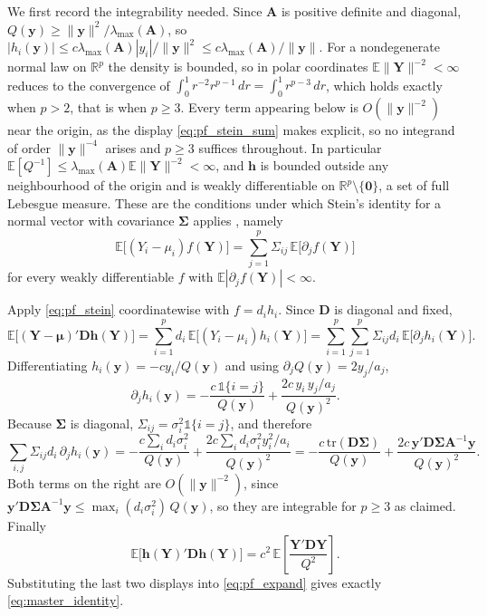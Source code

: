 \documentclass[pdflatex,sn-mathphys-num]{sn-jnl}%
\theoremstyle{thmstyleone}%
\theoremstyle{thmstyletwo}%
\theoremstyle{thmstylethree}%
\newcommand{\tr}{\mathrm{tr}}
\newcommand{\E}{\mathbb{E}}
\newcommand{\Real}{\mathbb{R}}
\begin{document}
\begin{appendices}
We first record the integrability needed. Since $\bm A$ is positive definite and diagonal, $Q(\bm y)\ge\|\bm y\|^2/\lambda_{\max}(\bm A)$, so $|h_i(\bm y)|\le c\lambda_{\max}(\bm A)|y_i|/\|\bm y\|^2\le c\lambda_{\max}(\bm A)/\|\bm y\|$. For a nondegenerate normal law on $\Real^p$ the density is bounded, so in polar coordinates $\E\|\bm Y\|^{-2}<\infty$ reduces to the convergence of $\int_0^{1}r^{-2}r^{p-1}\,dr=\int_0^{1}r^{p-3}\,dr$, which holds exactly when $p>2$, that is when $p\ge3$. Every term appearing below is $O(\|\bm y\|^{-2})$ near the origin, as the display \eqref{eq:pf_stein_sum} makes explicit, so no integrand of order $\|\bm y\|^{-4}$ arises and $p\ge3$ suffices throughout. In particular $\E[Q^{-1}]\le\lambda_{\max}(\bm A)\E\|\bm Y\|^{-2}<\infty$, and $\bm h$ is bounded outside any neighbourhood of the origin and is weakly differentiable on $\Real^p\setminus\{\bm 0\}$, a set of full Lebesgue measure. These are the conditions under which Stein's identity for a normal vector with covariance $\bm\Sigma$ applies \cite{stein1981, fourdrinier2018}, namely
\begin{equation}
\label{eq:pf_stein}
\E\bigl[(Y_i-\mu_i)f(\bm Y)\bigr]
=
\sum_{j=1}^{p}\Sigma_{ij}\,\E\bigl[\partial_jf(\bm Y)\bigr]
\end{equation}
for every weakly differentiable $f$ with $\E|\partial_jf(\bm Y)|<\infty$.

Apply \eqref{eq:pf_stein} coordinatewise with $f=d_ih_i$. Since $\bm D$ is diagonal and fixed,
\begin{equation}
\E\bigl[(\bm Y-\bm\mu)'\bm D\bm h(\bm Y)\bigr]
=
\sum_{i=1}^{p}d_i\,\E\bigl[(Y_i-\mu_i)h_i(\bm Y)\bigr]
=
\sum_{i=1}^{p}\sum_{j=1}^{p}\Sigma_{ij}d_i\,\E\bigl[\partial_jh_i(\bm Y)\bigr].
\end{equation}
Differentiating $h_i(\bm y)=-cy_i/Q(\bm y)$ and using $\partial_jQ(\bm y)=2y_j/a_j$,
\begin{equation}
\partial_jh_i(\bm y)
=
-\frac{c\,\mathbb 1\{i=j\}}{Q(\bm y)}
+\frac{2c\,y_i\,y_j/a_j}{Q(\bm y)^{2}} .
\end{equation}
Because $\bm\Sigma$ is diagonal, $\Sigma_{ij}=\sigma^2_i\mathbb 1\{i=j\}$, and therefore
\begin{equation}
\label{eq:pf_stein_sum}
\sum_{i,j}\Sigma_{ij}d_i\,\partial_jh_i(\bm y)
=
-\frac{c\sum_{i}d_i\sigma^2_i}{Q(\bm y)}
+\frac{2c\sum_{i}d_i\sigma^2_iy^2_i/a_i}{Q(\bm y)^{2}}
=
-\frac{c\,\tr(\bm D\bm\Sigma)}{Q(\bm y)}
+\frac{2c\,\bm y'\bm D\bm\Sigma\bm A^{-1}\bm y}{Q(\bm y)^{2}} .
\end{equation}
Both terms on the right are $O(\|\bm y\|^{-2})$, since $\bm y'\bm D\bm\Sigma\bm A^{-1}\bm y\le\max_i(d_i\sigma^2_i)\,Q(\bm y)$, so they are integrable for $p\ge3$ as claimed. Finally
\begin{equation}
\E\bigl[\bm h(\bm Y)'\bm D\bm h(\bm Y)\bigr]
=
c^{2}\,\E\left[\frac{\bm Y'\bm D\bm Y}{Q^{2}}\right].
\end{equation}
Substituting the last two displays into \eqref{eq:pf_expand} gives exactly \eqref{eq:master_identity}.


\end{appendices}
\end{document}
